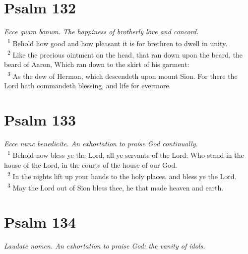 \documentclass[a5paper,12pt]{article}
\begin{document}
\begin{multicols*}{2}
\section{Psalm 132}
\label{sec:org24d54da}
\emph{Ecce quam bonum. The happiness of brotherly love and concord.}\\

~\textsuperscript{1} Behold how good and how pleasant it is for brethren to dwell in unity.\\
~\textsuperscript{2} Like the precious ointment on the head, that ran down upon the beard, the beard of Aaron, Which ran down to the skirt of his garment:\\
~\textsuperscript{3} As the dew of Hermon, which descendeth upon mount Sion. For there the Lord hath commandeth blessing, and life for evermore.\\

\section{Psalm 133}
\label{sec:orgc8217c7}
\emph{Ecce nunc benedicite. An exhortation to praise God continually.}\\

~\textsuperscript{1} Behold now bless ye the Lord, all ye servants of the Lord: Who stand in the house of the Lord, in the courts of the house of our God.\\
~\textsuperscript{2} In the nights lift up your hands to the holy places, and bless ye the Lord.\\
~\textsuperscript{3} May the Lord out of Sion bless thee, he that made heaven and earth.\\

\section{Psalm 134}
\label{sec:org6baf1d5}
\emph{Laudate nomen. An exhortation to praise God: the vanity of idols.}\\


\end{multicols*}
\end{document}
